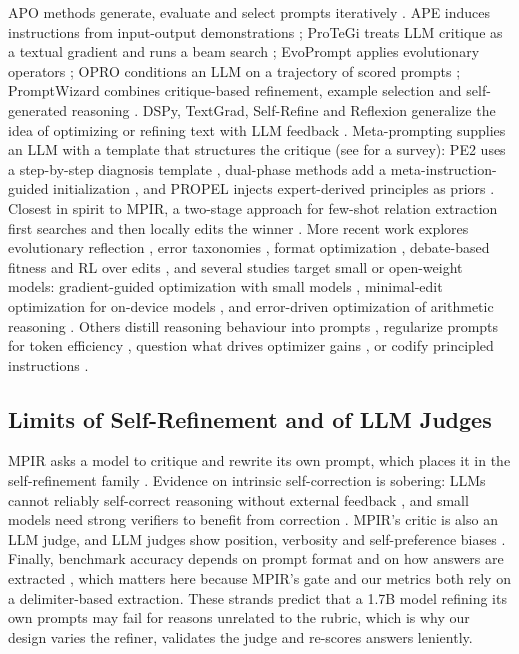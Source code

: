\documentclass{ieeeaccess}
\begin{document}
APO methods generate, evaluate and select prompts iteratively \cite{ramnath2025}. APE induces instructions from input-output demonstrations \cite{zhou2023}; ProTeGi treats LLM critique as a textual gradient and runs a beam search \cite{pryzant2023}; EvoPrompt applies evolutionary operators \cite{guo2024}; OPRO conditions an LLM on a trajectory of scored prompts \cite{yang2024}; PromptWizard combines critique-based refinement, example selection and self-generated reasoning \cite{agarwal2025}. DSPy, TextGrad, Self-Refine and Reflexion generalize the idea of optimizing or refining text with LLM feedback \cite{khattab2024,yuksekgonul2025,madaan2023,shinn2023}. Meta-prompting supplies an LLM with a template that structures the critique (see \cite{cui2025} for a survey): PE2 uses a step-by-step diagnosis template \cite{ye2024}, dual-phase methods add a meta-instruction-guided initialization \cite{yang2024b}, and PROPEL injects expert-derived principles as priors \cite{mayilvaghanan2025}. Closest in spirit to MPIR, a two-stage approach for few-shot relation extraction first searches and then locally edits the winner \cite{chakma2026}. More recent work explores evolutionary reflection \cite{agrawal2026}, error taxonomies \cite{singh2026}, format optimization \cite{liu2025}, debate-based fitness \cite{nair2025} and RL over edits \cite{lin2025}, and several studies target small or open-weight models: gradient-guided optimization with small models \cite{das2025}, minimal-edit optimization for on-device models \cite{shim2026}, and error-driven optimization of arithmetic reasoning \cite{pandy2026}. Others distill reasoning behaviour into prompts \cite{badhe2026}, regularize prompts for token efficiency \cite{shah2026}, question what drives optimizer gains \cite{zhu2025}, or codify principled instructions \cite{bsharat2023}.

\subsection{Limits of Self-Refinement and of LLM Judges}

MPIR asks a model to critique and rewrite its own prompt, which places it in the self-refinement family \cite{madaan2023,shinn2023}. Evidence on intrinsic self-correction is sobering: LLMs cannot reliably self-correct reasoning without external feedback \cite{huang2024}, and small models need strong verifiers to benefit from correction \cite{zhang2024}. MPIR's critic is also an LLM judge, and LLM judges show position, verbosity and self-preference biases \cite{zheng2023,wang2024c,panickssery2024}. Finally, benchmark accuracy depends on prompt format and on how answers are extracted \cite{sclar2024,wang2024d,zheng2024c}, which matters here because MPIR's gate and our metrics both rely on a delimiter-based extraction. These strands predict that a 1.7B model refining its own prompts may fail for reasons unrelated to the rubric, which is why our design varies the refiner, validates the judge and re-scores answers leniently.
\end{document}
